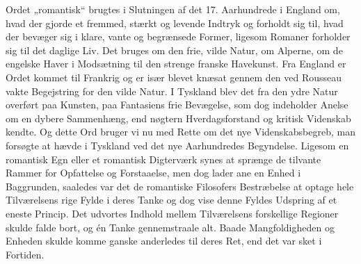 \documentclass[12pt,a4paper,openany]{book}
\newcommand{\opage}[1]{\marginnote{\footnotesize\textit{[#1]}}}
\begin{document}
Ordet „romantisk“ brugtes i Slutningen af det 17. Aarhundrede i
England om, hvad der gjorde et fremmed, stærkt og levende Indtryk
og forholdt sig til, hvad der bevæger sig i klare, vante og begrænsede
Former, ligesom Romaner forholder sig til det daglige Liv. Det
\opage{7}bruges om den frie, vilde Natur, om Alperne, om de engelske Haver
i Modsætning til den strenge franske Havekunst. Fra England er
Ordet kommet til Frankrig og er især blevet knæsat gennem den ved
Rousseau vakte Begejstring for den vilde Natur. I Tyskland blev det
fra den ydre Natur overført paa Kunsten, paa Fantasiens frie Bevægelse,
som dog indeholder Anelse om en dybere Sammenhæng, end
nøgtern Hverdagsforstand og kritisk Videnskab kendte. Og dette
Ord bruger vi nu med Rette om det nye Videnskabsbegreb, man
forsøgte at hævde i Tyskland ved det nye Aarhundredes Begyndelse.
Ligesom en romantisk Egn eller et romantisk Digterværk synes at
sprænge de tilvante Rammer for Opfattelse og Forstaaelse, men dog
lader ane en Enhed i Baggrunden, saaledes var det de romantiske
Filosofers Bestræbelse at optage hele Tilværelsens rige Fylde i deres
Tanke og dog vise denne Fyldes Udspring af et eneste Princip.
Det udvortes Indhold mellem Tilværelsens forskellige Regioner skulde
falde bort, og én Tanke gennemstraale alt. Baade Mangfoldigheden
og Enheden skulde komme ganske anderledes til deres Ret, end
det var sket i Fortiden.
\end{document}
